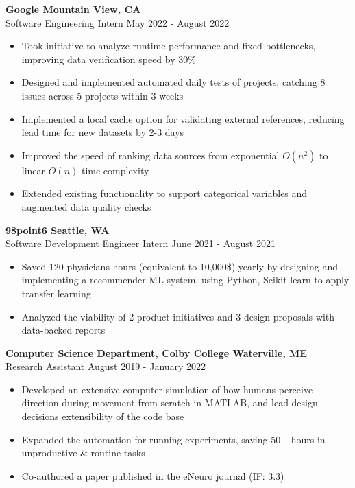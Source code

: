 \documentclass[letterpaper]{article}
\newcommand{\expheader}[4]{
    \vspace{2mm}
    \textbf{#1 \hfill #2}\\
    #3 \hfill #4\\
    \vspace{-3mm}
}
\begin{document}
\expheader{Google}{Mountain View, CA}{Software Engineering Intern}{May 2022 - August 2022}
\begin{itemize} \itemsep 0pt
	\item Took initiative to analyze runtime performance and fixed
		bottlenecks, improving data verification speed by 30\%
	\item Designed and implemented automated daily tests of projects, catching 8 issues  across 5 projects within 3 weeks
	\item Implemented a local cache option for validating external references,
		reducing lead time for new datasets by 2-3 days
    \item Improved the speed of ranking data sources from exponential $O(n^2)$ to linear $O(n)$ time complexity
	\item Extended existing functionality to support categorical variables and augmented data quality checks

\end{itemize}

\expheader{98point6}{Seattle, WA}{Software Development Engineer Intern}{June
2021 - August 2021}
\begin{itemize} \itemsep 0pt
    \item Saved 120 physicians-hours (equivalent to 10,000\$) yearly by designing and implementing a recommender ML system, using Python, Scikit-learn to apply transfer learning
	\item Analyzed the viability of 2 product initiatives and 3 design proposals with data-backed reports
\end{itemize}

\expheader{Computer Science Department, Colby College}{Waterville, ME}{Research Assistant}{August 2019 - January 2022}
\begin{itemize} \itemsep 0pt
	\item Developed an extensive computer simulation of how humans perceive direction during movement from scratch in MATLAB, and lead design decisions extensibility of the code base
	\item Expanded the automation for running experiments, saving 50+ hours in unproductive \& routine tasks
	\item Co-authored a paper published in the eNeuro journal (IF: 3.3)
\end{itemize}
\end{document}
